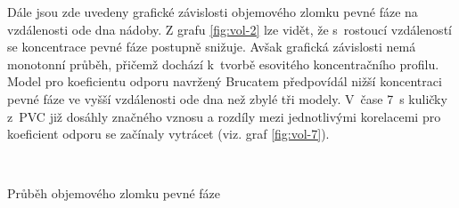Dále jsou zde uvedeny grafické závislosti objemového zlomku pevné fáze na vzdálenosti ode dna nádoby. Z grafu \ref{fig:vol-2} lze vidět, že s~rostoucí vzdáleností se koncentrace pevné fáze postupně snižuje. Avšak grafická závislosti nemá monotonní průběh, přičemž dochází k~tvorbě esovitého koncentračního profilu. Model pro koeficientu odporu navržený Brucatem předpovídál nižší koncentraci pevné fáze ve vyšší vzdálenosti ode dna než zbylé tři modely. V~čase \SI{7}{\second} kuličky z~PVC již dosáhly značného vznosu a rozdíly mezi jednotlivými korelacemi pro koeficient odporu se začínaly vytrácet (viz. graf \ref{fig:vol-7}).
\begin{grf}[h!]
 \centering
  \\ 
  \caption{Průběh objemového zlomku pevné fáze}
  \label{fig:vol}
\end{grf}
\newpage

